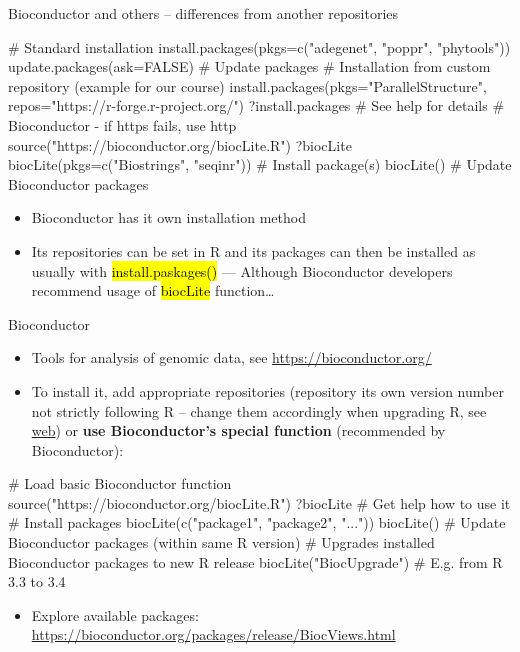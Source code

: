 \documentclass[compress, ucs, xelatex, 11pt, xcolor=svgnames,
  hyperref={
    bookmarks=true,
    unicode=true,
    colorlinks=true,
    pdftitle={Molecular data in R},
    plainpages=false,
    pdfauthor={Vojtech Zeisek},
    pdfsubject={Course about phylogeny and evolution in R},
    pdfcreator={XeLaTeX},
    pdfkeywords={R, evolution, phylogeny, molecular data},
    linkcolor=Tomato,
    anchorcolor=SaddleBrown,
    citecolor=Goldenrod,
    filecolor=DarkMagenta,
    menucolor=Sienna,
    urlcolor=DarkTurquoise,
    pdftex},
  url={hyphens, lowtilde} %
  ]{beamer}
\renewcommand{\texttt}[1]{\hl{\ttfamily #1}}
\begin{document}
\begin{frame}[fragile]{Bioconductor and others -- differences from another repositories}
  \label{sources-diff}
  \begin{spluscode}
    # Standard installation
    install.packages(pkgs=c("adegenet", "poppr", "phytools"))
    update.packages(ask=FALSE) # Update packages
    # Installation from custom repository (example for our course)
    install.packages(pkgs="ParallelStructure",
      repos="https://r-forge.r-project.org/")
    ?install.packages # See help for details
    # Bioconductor - if https fails, use http
    source("https://bioconductor.org/biocLite.R")
    ?biocLite
    biocLite(pkgs=c("Biostrings", "seqinr")) # Install package(s)
    biocLite() # Update Bioconductor packages
  \end{spluscode}
  \begin{itemize}
    \item Bioconductor has it own installation method
    \item Its repositories can be set in R and its packages can then be installed as usually with \texttt{install.paskages()} --- Although Bioconductor developers recommend usage of \texttt{biocLite} function\ldots
  \end{itemize}
\end{frame}

\begin{frame}[fragile]{Bioconductor}
  \label{bioc}
  \begin{itemize}
    \item Tools for analysis of genomic data, see \url{https://bioconductor.org/}
    \item To install it, add appropriate repositories (repository its own version number not strictly following R -- change them accordingly when upgrading R, see \href{https://bioconductor.org/install/#bioc-version}{web}) or \textbf{use Bioconductor's special function} (recommended by Bioconductor):
  \end{itemize}
  \begin{spluscode}
    # Load basic Bioconductor function
    source("https://bioconductor.org/biocLite.R")
    ?biocLite # Get help how to use it
    # Install packages
    biocLite(c("package1", "package2", "..."))
    biocLite() # Update Bioconductor packages (within same R version)
    # Upgrades installed Bioconductor packages to new R release
    biocLite("BiocUpgrade") # E.g. from R 3.3 to 3.4
  \end{spluscode}
  \begin{itemize}
    \item Explore available packages: \url{https://bioconductor.org/packages/release/BiocViews.html}
  \end{itemize}
\end{frame}
\end{document}
